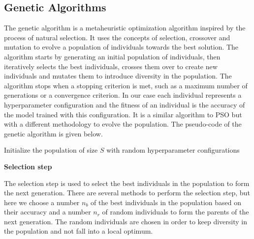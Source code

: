\documentclass[a4 paper,11pt,2]{article}
\begin{document}
\subsection{Genetic Algorithms}
The genetic algorithm is a metaheuristic optimization algorithm inspired by the
process of natural selection. It uses the concepts of selection, crossover and
mutation to evolve a population of individuals towards the best solution. The
algorithm starts by generating an initial population of individuals, then
iteratively selects the best individuals, crosses them over to create new
individuals and mutates them to introduce diversity in the population. The
algorithm stops when a stopping criterion is met, such as a maximum number of
generations or a convergence criterion. In our case each individual represents
a hyperparameter configuration and the fitness of an individual is the accuracy
of the model trained with this configuration. It is a similar algorithm to PSO
but with a different methodology to evolve the population. The pseudo-code of
the genetic algorithm is given below.

\begin{algorithm}[H]
    \SetAlgoLined
    \caption{Genetic Algorithm (GA) algorithm}
    \BlankLine
    Initialize the population of size $S$ with random hyperparameter configurations\;
\end{algorithm}
\vspace{5pt}

\textbf{Selection step}

The selection step is used to select the best individuals in the population to
form the next generation. There are several methods to perform the selection
step, but here we choose a number $n_b$ of the best individuals in the
population based on their accuracy and a number $n_r$ of random individuals to
form the parents of the next generation. The random individuals are chosen in
order to keep diversity in the population and not fall into a local optimum.
\end{document}
